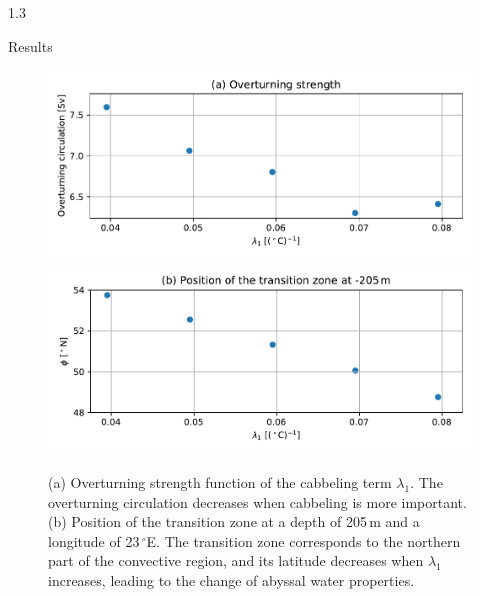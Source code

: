 \documentclass[final]{beamer}
\newlength{\colwidth}
\begin{document}
\begin{frame}[t]
\begin{columns}[t]
\begin{column}{1.3\colwidth}
\begin{alertblock}{Results}
\begin{minipage}{.35\textwidth}
      \begin{figure}
        \centering
        \includegraphics[width=6.7in]{oc_vs_eos}
        \\
        \includegraphics[width=6.7in]{beta_pos}
        \caption{(a) Overturning strength function of the cabbeling term $\lambda_1$.
          The overturning circulation decreases when cabbeling is more important.
          (b) Position of the transition zone at a depth of 205\,m and a longitude of
          23\,$^\circ$E.
          The transition zone corresponds to the northern part of the convective region,
          and its latitude decreases when $\lambda_1$ increases, leading to the
          change of abyssal water properties.}
      \end{figure}
    \end{minipage}
    \begin{minipage}{.6\textwidth}
      \begin{figure}

\end{figure}
\end{minipage}
\end{alertblock}
\end{column}
\end{columns}
\end{frame}
\end{document}
